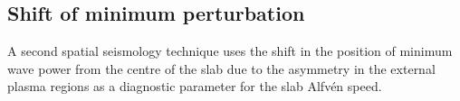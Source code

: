 \documentclass[namedreferences]{solarphysics}
\numberwithin{equation}{section}
\begin{document}
\begin{article}


\section{Shift of minimum perturbation}
A second spatial seismology technique uses the shift in the position of minimum wave power from the centre of the slab due to the asymmetry in the external plasma regions as a diagnostic parameter for the slab Alfv\'{e}n speed.


\end{article}
\end{document}
